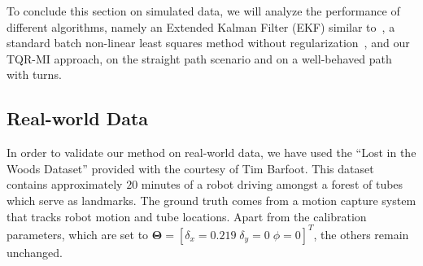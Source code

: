 
To conclude this section on simulated data, we will analyze the performance of
different algorithms, namely an Extended Kalman Filter (EKF) similar
to~\cite{martinelli06automatic}, a standard batch non-linear least squares
method without regularization~\cite{kuemmerle11simultaneous}, and our TQR-MI
approach, on the straight path scenario and on a well-behaved path with turns.

\subsection{Real-world Data}

In order to validate our method on real-world data, we have used the ``Lost in
the Woods Dataset'' provided with the courtesy of Tim Barfoot. This dataset
contains approximately $20$ minutes of a robot driving amongst a forest of
tubes which serve as landmarks. The ground truth comes from a motion capture
system that tracks robot motion and tube locations. Apart from the calibration
parameters, which are set to $\mathbf{\Theta}=[\delta_x=0.219\;\delta_y=0\;
\phi=0]^T$, the others remain unchanged.
